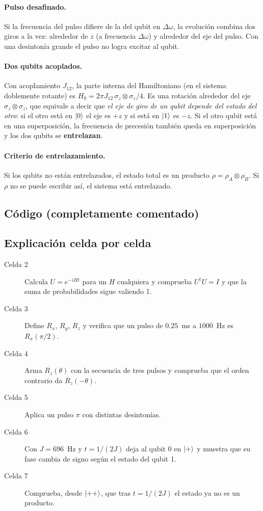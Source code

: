 \paragraph{Pulso desafinado.} Si la frecuencia del pulso difiere de la del
qubit en $\Delta\omega$, la evolución combina dos giros a la vez: alrededor de
$z$ (a frecuencia $\Delta\omega$) y alrededor del eje del pulso. Con una
desintonía grande el pulso no logra excitar al qubit.

\paragraph{Dos qubits acoplados.} Con acoplamiento $J_{12}$, la parte interna
del Hamiltoniano (en el sistema doblemente rotante) es
$H_0=2\pi J_{12}\,\sigma_z\otimes\sigma_z/4$. Es una rotación alrededor del eje
$\sigma_z\otimes\sigma_z$, que equivale a decir que \emph{el eje de giro de un
qubit depende del estado del otro}: si el otro está en $\left|0\right\rangle$ el eje es $+z$ y
si está en $\left|1\right\rangle$ es $-z$. Si el otro qubit está en una superposición, la
frecuencia de precesión también queda en superposición y los dos qubits se
\textbf{entrelazan}.

\paragraph{Criterio de entrelazamiento.} Si los qubits no están entrelazados,
el estado total es un producto $\rho=\rho_A\otimes\rho_B$. Si $\rho$ no se
puede escribir así, el sistema está entrelazado.

\subsection{Código (completamente comentado)}


\subsection{Explicación celda por celda}
\begin{description}
  \item[Celda 2] Calcula $U=e^{-iHt}$ para un $H$ cualquiera y comprueba
    $U^\dagger U=I$ y que la suma de probabilidades sigue valiendo 1.
  \item[Celda 3] Define $R_x$, $R_y$, $R_z$ y verifica que un pulso de
    $0.25$~ms a $1000$~Hz es $R_x(\pi/2)$.
  \item[Celda 4] Arma $R_z(\theta)$ con la secuencia de tres pulsos y
    comprueba que el orden contrario da $R_z(-\theta)$.
  \item[Celda 5] Aplica un pulso $\pi$ con distintas desintonías.
  \item[Celda 6] Con $J=696$~Hz y $t=1/(2J)$ deja al qubit 0 en $\left|+\right\rangle$ y
    muestra que su fase cambia de signo según el estado del qubit 1.
  \item[Celda 7] Comprueba, desde $\left|++\right\rangle$, que tras $t=1/(2J)$ el estado
    ya no es un producto.
\end{description}

